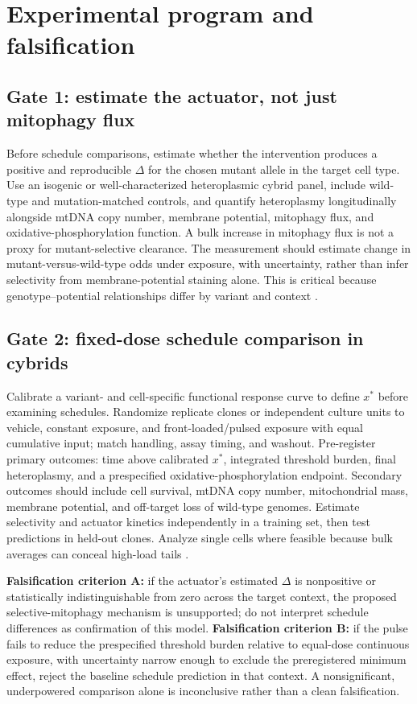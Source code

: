 \documentclass[11pt]{article}
\begin{document}
\section{Experimental program and falsification}
\subsection{Gate 1: estimate the actuator, not just mitophagy flux}
Before schedule comparisons, estimate whether the intervention produces a positive and reproducible $\Delta$ for the chosen mutant allele in the target cell type. Use an isogenic or well-characterized heteroplasmic cybrid panel, include wild-type and mutation-matched controls, and quantify heteroplasmy longitudinally alongside mtDNA copy number, membrane potential, mitophagy flux, and oxidative-phosphorylation function. A bulk increase in mitophagy flux is not a proxy for mutant-selective clearance. The measurement should estimate change in mutant-versus-wild-type odds under exposure, with uncertainty, rather than infer selectivity from membrane-potential staining alone. This is critical because genotype--potential relationships differ by variant and context \cite{Seabright2020,Ryall2026}.

\subsection{Gate 2: fixed-dose schedule comparison in cybrids}
Calibrate a variant- and cell-specific functional response curve to define $x^*$ before examining schedules. Randomize replicate clones or independent culture units to vehicle, constant exposure, and front-loaded/pulsed exposure with equal cumulative input; match handling, assay timing, and washout. Pre-register primary outcomes: time above calibrated $x^*$, integrated threshold burden, final heteroplasmy, and a prespecified oxidative-phosphorylation endpoint. Secondary outcomes should include cell survival, mtDNA copy number, mitochondrial mass, membrane potential, and off-target loss of wild-type genomes. Estimate selectivity and actuator kinetics independently in a training set, then test predictions in held-out clones. Analyze single cells where feasible because bulk averages can conceal high-load tails \cite{Green2025}.

\textbf{Falsification criterion A:} if the actuator's estimated $\Delta$ is nonpositive or statistically indistinguishable from zero across the target context, the proposed selective-mitophagy mechanism is unsupported; do not interpret schedule differences as confirmation of this model. \textbf{Falsification criterion B:} if the pulse fails to reduce the prespecified threshold burden relative to equal-dose continuous exposure, with uncertainty narrow enough to exclude the preregistered minimum effect, reject the baseline schedule prediction in that context. A nonsignificant, underpowered comparison alone is inconclusive rather than a clean falsification.
\end{document}

